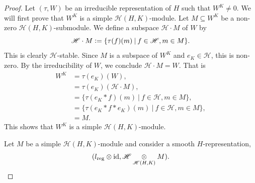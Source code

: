 \documentclass[8pt]{article}
\DeclareMathOperator{\id}{id}
\DeclareMathOperator{\reg}{reg}
\newcommand{\defeq}{\vcentcolon=}
\newcommand{\sep}[0]{\:|\:}
\newcommand{\hecke}[0]{\mathscr{H}}
\newcommand{\tens}[1]{%
  \mathbin{\mathop{\otimes}\displaylimits_{#1}}%
}
\begin{document}
\begin{proof}
  Let $(\tau,W)$ be an irreducible representation of $H$ such that $W^K\not=0$. We will first prove that $W^K$ is a simple $\hecke(H,K)$-module. Let $M\subseteq W^K$ be a non-zero
  $\hecke(H,K)$-submodule. We define a subspace $\hecke\cdot M$ of $W$ by 
  \begin{equation*}
    \hecke\cdot M\defeq \{\tau(f)(m)\sep f\in\hecke,m\in M\}.
  \end{equation*}
  This is clearly $\hecke$-stable. Since $M$ is a subspace of $W^K$ and $e_K\in\hecke$, this is non-zero. By the irreducibility of $W$, we conclude $\hecke\cdot M = W$.
  That is 
  \begin{align*}
    W^K &=\tau(e_K)(W),\\
    & = \tau(e_K)(\hecke\cdot M),\\
    & = \{\tau(e_K\ast f)(m)\sep f\in\hecke, m\in M\},\\
    & = \{\tau(e_K\ast f\ast e_K)(m)\sep f\in\hecke,m\in M\},\\
    & = M.
  \end{align*}
  This shows that $W^K$ is a simple $\hecke(H,K)$-module.
  \par Let $M$ be a simple $\hecke(H,K)$-module and consider a smooth $H$-representation, 
  \begin{equation*}
    (l_{\reg}\otimes\id,\hecke\tens{\hecke(H,K)}M).
  \end{equation*}
 

\end{proof}
\end{document}

